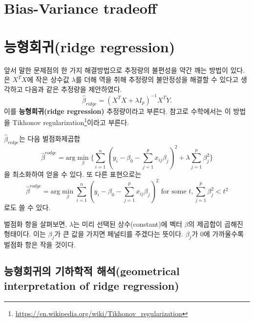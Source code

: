 \documentclass[b5paper,]{scrbook}
\theoremstyle{plain}
\theoremstyle{definition}
\numberwithin{equation}{section}
\renewcommand{\href}[2]{#2\footnote{\url{#1}}}
\begin{document}
\hypertarget{bias-variance-tradeoff}{%
\section{Bias-Variance tradeoff}\label{bias-variance-tradeoff}}

\hypertarget{ridge-regression}{%
\section{능형회귀(ridge regression)}\label{ridge-regression}}

앞서 말한 문제점의 한 가지 해결방법으로 추정량의 불편성을 약간 깨는 방법이 있다. \citep{Hoerl1970}은 \(X^{T}X\)에 작은 상수값 \(\lambda\)를 더해 역을 취해 추정량의 불안정성을 해결할 수 있다고 생각하고 다음과 같은 추정량을 제안하였다.
\[\hat{\beta}_{ridge}=(X^{T}X+\lambda I_{p})^{-1}X^{T}Y.\]
이를 \textbf{능형회귀(ridge regression)} 추정량이라고 부른다. 참고로 수학에서는 이 방법을 \href{https://en.wikipedia.org/wiki/Tikhonov_regularization}{Tikhonov regularization}이라고 부른다.

\(\hat{\beta}_{ridge}\)는 다음 벌점화제곱합
\[\hat{\beta}^{rodge}=\text{arg}\min_{\beta}\{\sum_{i=1}^{n}(y_{i}-\beta_{0}-\sum_{j=1}^{p}x_{ij}\beta_{j})^{2}+\lambda\sum_{j=1}^{p}\beta_{j}^{2}\}\]
을 최소화하여 얻을 수 있다. 또 다른 표현으로는
\[\hat{\beta}^{rodge}=\text{arg}\min_{\beta}\sum_{i=1}^{n}(y_{i}-\beta_{0}-\sum_{j=1}^{p}x_{ij}\beta_{j})^{2}\text{ for some } t, \sum_{j=1}^{p}\beta_{j}^{2}<t^{2}\]
로도 쓸 수 있다.

벌점화 항을 살펴보면, \(\lambda\)는 미리 선택된 상수(constant)에 벡터 \(\beta\)의 제곱합이 곱해진 형태이다. 이는 \(\beta_{j}\)가 큰 값을 가지면 페널티를 주겠다는 뜻이다. \(\beta_{j}\)가 0에 가까울수록 벌점화 항은 작을 것이다.

\hypertarget{--geometrical-interpretation-of-ridge-regression}{%
\subsection{능형회귀의 기하학적 해석(geometrical interpretation of ridge regression)}\label{--geometrical-interpretation-of-ridge-regression}}
\end{document}
